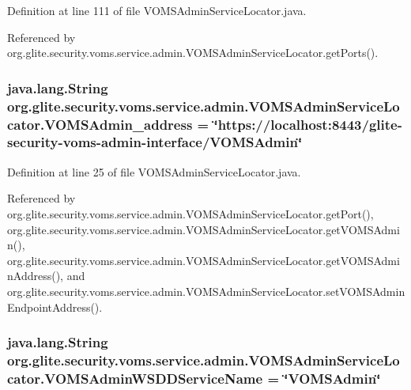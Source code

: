Definition at line 111 of file VOMSAdminServiceLocator.java.



Referenced by org.glite.security.voms.service.admin.VOMSAdminServiceLocator.getPorts().

\hypertarget{classorg_1_1glite_1_1security_1_1voms_1_1service_1_1admin_1_1VOMSAdminServiceLocator_a65424a457a064c5405aad0ca1304503e}{
\subsubsection[{VOMSAdmin\_\-address}]{\setlength{\rightskip}{0pt plus 5cm}java.lang.String {\bf org.glite.security.voms.service.admin.VOMSAdminServiceLocator.VOMSAdmin\_\-address} = \char`\"{}https://localhost:8443/glite-\/security-\/voms-\/admin-\/interface/{\bf VOMSAdmin}\char`\"{}}}
\label{classorg_1_1glite_1_1security_1_1voms_1_1service_1_1admin_1_1VOMSAdminServiceLocator_a65424a457a064c5405aad0ca1304503e}


Definition at line 25 of file VOMSAdminServiceLocator.java.



Referenced by org.glite.security.voms.service.admin.VOMSAdminServiceLocator.getPort(), org.glite.security.voms.service.admin.VOMSAdminServiceLocator.getVOMSAdmin(), org.glite.security.voms.service.admin.VOMSAdminServiceLocator.getVOMSAdminAddress(), and org.glite.security.voms.service.admin.VOMSAdminServiceLocator.setVOMSAdminEndpointAddress().

\hypertarget{classorg_1_1glite_1_1security_1_1voms_1_1service_1_1admin_1_1VOMSAdminServiceLocator_a00b09a56a70c27e1f729adfec6f6b9d1}{
\subsubsection[{VOMSAdminWSDDServiceName}]{\setlength{\rightskip}{0pt plus 5cm}java.lang.String {\bf org.glite.security.voms.service.admin.VOMSAdminServiceLocator.VOMSAdminWSDDServiceName} = \char`\"{}VOMSAdmin\char`\"{}}}
\label{classorg_1_1glite_1_1security_1_1voms_1_1service_1_1admin_1_1VOMSAdminServiceLocator_a00b09a56a70c27e1f729adfec6f6b9d1}


